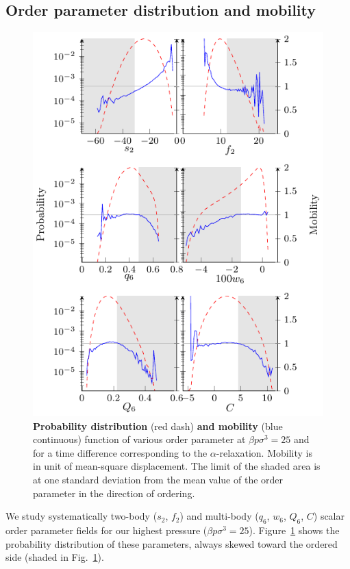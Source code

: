 \documentclass[twocolumn,superscriptaddress]{revtex4-1}
\begin{document}
\subsection{Order parameter distribution and mobility}

\begin{figure}
	\centering
	\includegraphics{fig_distrib}
	\caption{\textbf{Probability distribution} (red dash) \textbf{and mobility} (blue continuous) function of various order parameter at $\beta p\sigma^3=25$ and for a time difference corresponding to the $\alpha$-relaxation. Mobility is in unit of mean-square displacement. The limit of the shaded area is at one standard deviation from the mean value of the order parameter in the direction of ordering.}
	\label{fig:distrib}
\end{figure}

We study systematically two-body ($s_2$, $f_2$) and multi-body ($q_6$, $w_6$, $Q_6$, $C$) scalar order parameter fields for our highest pressure ($\beta p\sigma^3=25$). Figure~\ref{fig:distrib} shows the probability distribution of these parameters, always skewed toward the ordered side (shaded in Fig.~\ref{fig:distrib}).
\end{document}
